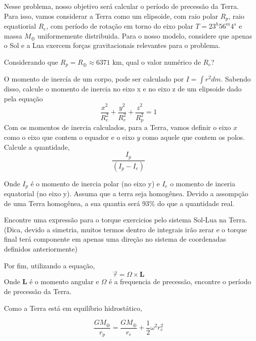 \documentclass[11pt]{article}
\begin{document}
\begin{pproblem}
    Nesse problema, nosso objetivo será calcular o período de precessão da Terra. Para isso, vamos considerar a Terra como um elipsoide, com raio polar $R_p$, raio equatiorial $R_e$, com período de rotação em torno do eixo polar $T = 23^h56^m4^s$ e massa $M_\oplus$ uniformemente distribuida. Para o nosso modelo, considere que apenas o Sol e a Lua exercem forças gravitacionais relevantes para o problema.
    \begin{alternativas}
        \item Considerando que $R_p = R_\oplus\approx 6371 \text{ km}$, qual o valor numérico de $R_e$?
        
        \item O momento de inercía de um corpo, pode ser calculado por $I = \int r^2 dm$. Sabendo disso, calcule o momento de inercia no eixo x e no eixo z de um elipsoide dado pela equação 
        $$\frac{x^2}{R_e^2} + \frac{y^2}{R_e^2} + \frac{z^2}{R_p^2}= 1$$
        Com os momentos de inercia calculados, para a Terra, vamos definir o eixo $x$ como o eixo que contem o equador e o eixo $y$ como aquele que contem os polos. Calcule a quantidade, 
        $$\frac{I_p}{(I_p-I_e)}$$

        Onde $I_p$ é o momento de inercia polar (no eixo y) e $I_e$ o momento de inceria equatorial (no eixo y). Assuma que a terra seja homogênea. Devido a assompção de uma Terra homogênea, a sua quantia será 93\% do que a quantidade real. 
        

        \item Encontre uma expressão para o torque exercicios pelo sistema Sol-Lua na Terra. (Dica, devido a simetria, muitos termos dentro de integrais irão zerar e o torque final terá componente em apenas uma direção no sistema de coordenadas definidos anteriormente)
        \item Por fim, utilizando a equação, 
        $$\vec{\tau} = \Omega \times \mathbf{L} $$
        Onde $\mathbf{L}$ é o momento angular e $\Omega$ é a frequencia de precessão, encontre o período de precessão da Terra.
    \end{alternativas}

    \begin{pssolution*}{}{}
        \begin{alternativas}
            \item Como a Terra está em equilíbrio hidrostático, 
            
            \[\frac{GM_\oplus}{r_p} = \frac{GM_\oplus}{r_e}+\frac{1}{2}\omega^2 r_e^2\]
        

\end{alternativas}
\end{pssolution*}
\end{pproblem}
\end{document}
